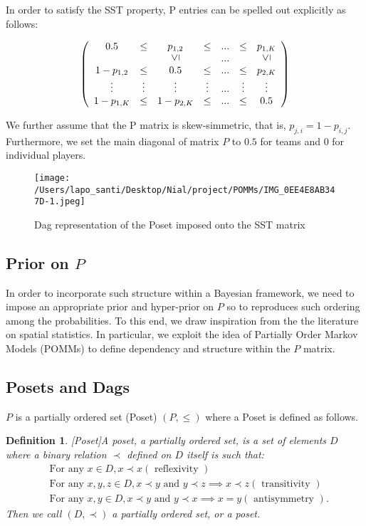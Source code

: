 \documentclass[11pt]{amsart}
\newtheorem{definition}{Definition}
\newcommand{\vertgeq}{\rotatebox{90}{$\leq$}}
\begin{document}
In order to satisfy the SST property, P entries can be spelled out explicitly as follows:
\begin{center}
$$
\left(\begin{array}{ccccccc} 0.5 & \leq & p_{1,2} & \leq &  ... & \leq & p_{1,K} \\  &  & \vertgeq &  & ... &  & \vertgeq \\
1 - p_{1,2} & \leq & 0.5 & \leq & ... & \leq & p_{2,K} \\ \vdots & \vdots & \vdots & \vdots &  ... & \vdots& \vdots \\ 1 - p_{1,K}& \leq & 1 - p_{2,K}& \leq & ... & \leq & 0.5\end{array}\right)
$$
\end{center}

We further assume that the P matrix is skew-simmetric, that is, $p_{j,i}= 1 - p_{i,j}$. Furthermore, we set the main diagonal of matrix $P$ to $0.5$ for teams and $0$ for individual players.

\begin{figure}
\begin{center}
\texttt{[image: /Users/lapo\_santi/Desktop/Nial/project/POMMs/IMG\_0EE4E8AB347D-1.jpeg]}
\caption{Dag representation of the Poset imposed onto the SST matrix}
\label{fig:DAG}
\end{center}
\end{figure}


\subsection{Prior on $P$}

In order to incorporate such structure within a Bayesian framework, we need to impose an appropriate prior and hyper-prior on $P$ so to reproduces such ordering among the probabilities. To this end, we draw inspiration from the the literature on spatial statistics. In particular, we exploit the idea of Partially Order Markov Models (POMMs) to define dependency and structure within the $P$ matrix. 

\subsection{Posets and Dags}
 $P$ is a partially ordered set (Poset) $(P, \leq)$ where a Poset is defined as follows.

\begin{definition}\label{def:Poset}[Poset]A poset, a partially ordered set, is a set of elements $D$ where a binary relation $\prec$ defined on $D$ itself is such that:
\begin{align}
&\text{For any } x \in D, x \prec x (\text{ reflexivity }) \\
&\text{For any } x,y,z \in D, x \prec y \text{ and } y \prec z \implies x \prec z (\text{ transitivity }) \\
&\text{For any } x, y \in D, x \prec y \text{ and } y \prec x \implies x = y (\text{ antisymmetry }).
\end{align}
Then we call $(D, \prec)$ a partially ordered set, or a \textit{poset}. 
\end{definition}
\end{document}
